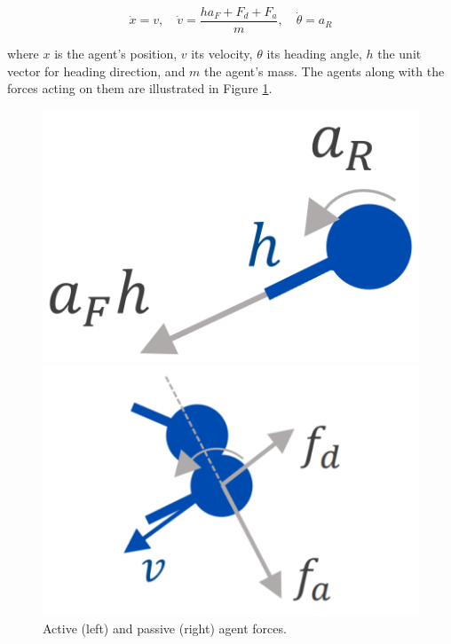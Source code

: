 \documentclass[9pt]{IEEEtran}
\begin{document}
$$ \dot{x} = v, \quad \dot{v} = \frac{ha_F + F_d + F_a}{m}, \quad \dot{\theta} = a_R $$  

where $x$ is the agent's position, $v$ its velocity, $\theta$ its heading angle, $h$ the unit vector for heading direction, and $m$ the agent's mass. The agents along with the forces acting on them are illustrated in Figure \ref{fig:main_figure}.

\begin{figure}[hbt]
    \centering
    \begin{minipage}{0.2\textwidth}
        \centering
        \includegraphics[width=\textwidth]{agent_active.png}
    \end{minipage}
    \hspace{0.1cm}
    \begin{minipage}{0.25\textwidth}
        \centering
        \includegraphics[width=\textwidth]{agent_passive.png}
    \end{minipage}
    \caption{Active (left) and passive (right) agent forces. \cite{li2023predator}}
    \label{fig:main_figure}
\end{figure}
\end{document}
